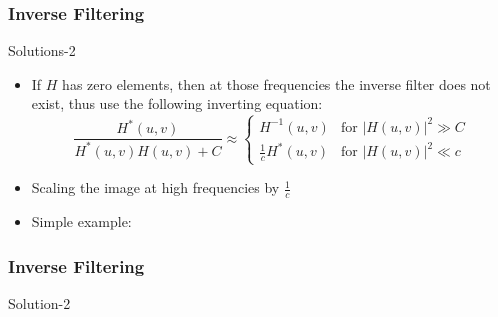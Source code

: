 \documentclass{beamer}
\begin{document}
\begin{frame}
\frametitle{Inverse Filtering}
\begin{block}{Solutions-2}
\begin{itemize}
\item If $H$ has zero elements, then at those frequencies the inverse filter does not exist, thus use the following inverting equation:
\[ \frac{H^{\ast}(u,v)}{H^{\ast}(u,v)H(u,v)+C} \approx 
	\begin{cases} 
   	H^{-1}(u,v) & \text{for } \vert H(u,v) \vert^{2} \gg C   \\
   	\frac{1}{c} H^{\ast}(u,v) & \text{for } \vert H(u,v) \vert^{2} \ll c
  	\end{cases}	
  	\]
\item Scaling the image at high frequencies by $\frac{1}{c}$ 
\item Simple example:\\

\end{itemize}
\end{block}
\end{frame}
\begin{frame}
\frametitle{Inverse Filtering}
\begin{block}{Solution-2}
\end{block}
\end{frame}
\end{document}
